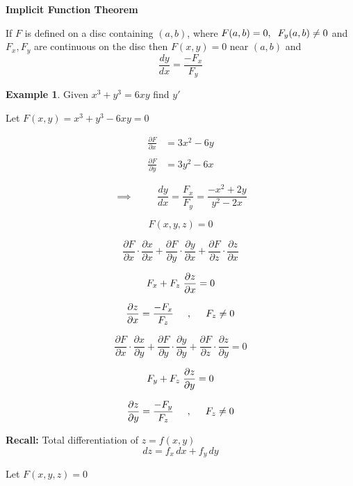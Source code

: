 \documentclass[11pt,a4paper]{article}
\theoremstyle{definition}
\newtheorem{exa}[thm]{Example}
\newcommand{\subhead}[1]{%
  \par\medskip\noindent\textbf{#1}\par\nobreak\smallskip}
\begin{document}
\subhead{Implicit Function Theorem}


If $F$ is defined on a disc containing $(a,b)$, where $F(a,b) =0,\hspace{0.2cm} F_y(a,b) \neq 0$ and $F_x, F_y$ are continuous on the disc then $F(x,y) =0$ near $(a,b)$ and $$\frac{dy}{dx}=\frac{-F_x}{F_y}$$


\begin{exa}


Given $x^3 + y^3 = 6xy$ find $y'$


Let $F(x,y) = x^3 + y^3 - 6xy = 0$

\begin{align*}
\frac{\partial F}{\partial x} & = 3x^2 - 6y\\\\
\frac{\partial F}{\partial y} & = 3y^2 - 6x
\end{align*}

$$\implies \hspace{1cm} \frac{dy}{dx}=\frac{F_x}{F_y} = \frac{-x^2 + 2y}{y^2 -2x}$$


$$F(x,y,z) = 0$$

$$\frac{\partial F}{\partial x}\cdot \frac{\partial x}{\partial x} + \frac{\partial F}{\partial y}\cdot \frac{\partial y}{\partial x} + \frac{\partial F}{\partial z}\cdot \frac{\partial z}{\partial x}$$

$$F_x + F_z\hspace{0.1cm} \frac{\partial z}{\partial x} =0$$

$$\frac{\partial z}{\partial x} = \frac{-F_x}{F_z}\hspace{0.5cm} , \hspace{0.5cm} F_z\neq 0$$


$$\frac{\partial F}{\partial x}\cdot \frac{\partial x}{\partial y} + \frac{\partial F}{\partial y}\cdot \frac{\partial y}{\partial y} + \frac{\partial F}{\partial z}\cdot \frac{\partial z}{\partial y}=0$$

$$F_y + F_z\hspace{0.1cm}\frac{\partial z}{\partial y} = 0$$

$$\frac{\partial z}{\partial y} = \frac{-F_y}{F_z}\hspace{0.5cm},\hspace{0.5cm} F_z\neq 0$$


\textbf{Recall:} Total differentiation of $z = f(x,y)$ $$dz = f_x \,dx + f_y\, dy$$

Let $F(x,y,z) = 0$
\end{exa}
\end{document}
